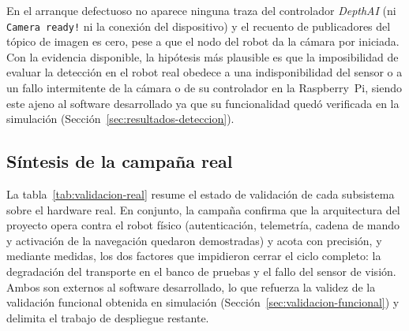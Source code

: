 En el arranque defectuoso no aparece ninguna traza del controlador \emph{DepthAI} (ni
\texttt{Camera ready!} ni la conexión del dispositivo) y el recuento de publicadores del tópico de
imagen es cero, pese a que el nodo del robot da la cámara por iniciada. 
Con la evidencia disponible, la hipótesis más plausible
es que la imposibilidad de evaluar la detección en el robot real obedece a una indisponibilidad del sensor o a un fallo intermitente
de la cámara o de su controlador en la Raspberry~Pi, siendo este ajeno al software
desarrollado ya que su funcionalidad quedó verificada en la simulación (Sección~\ref{sec:resultados-deteccion}).

\subsection{Síntesis de la campaña real}
\label{sec:real-sintesis}

La tabla~\ref{tab:validacion-real} resume el estado de validación de cada subsistema sobre el
hardware real. En conjunto, la campaña confirma que la arquitectura del proyecto opera contra el
robot físico (autenticación, telemetría, cadena de mando y activación de la navegación quedaron
demostradas) y acota con precisión, y mediante medidas, los dos factores que impidieron cerrar el
ciclo completo: la degradación del transporte en el banco de pruebas y el fallo del
sensor de visión. Ambos son externos al software desarrollado, lo que refuerza la validez de la validación
funcional obtenida en simulación (Sección~\ref{sec:validacion-funcional}) y delimita el trabajo de
despliegue restante.

